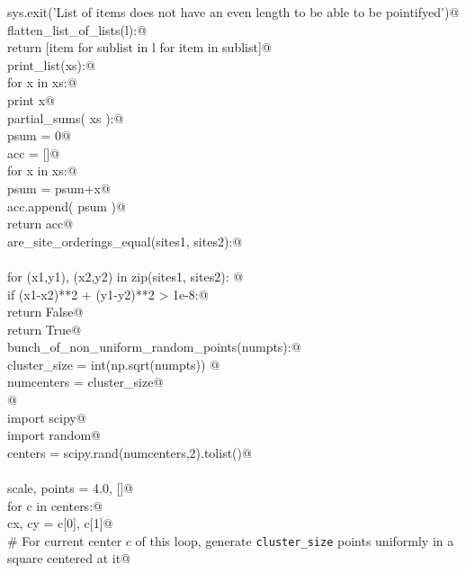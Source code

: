 \documentclass[10pt, english, oneside]{report}
\begin{document}
\begin{appendices}
\begin{flushleft}
\begin{list}{}{}
\mbox{}\verb@        sys.exit('List of items does not have an even length to be able to be pointifyed')@\\
\mbox{}\verb@def flatten_list_of_lists(l):@\\
\mbox{}\verb@       return [item for sublist in l for item in sublist]@\\
\mbox{}\verb@def print_list(xs):@\\
\mbox{}\verb@    for x in xs:@\\
\mbox{}\verb@        print x@\\
\mbox{}\verb@def partial_sums( xs ):@\\
\mbox{}\verb@    psum = 0@\\
\mbox{}\verb@    acc = []@\\
\mbox{}\verb@    for x in xs:@\\
\mbox{}\verb@        psum = psum+x@\\
\mbox{}\verb@        acc.append( psum )@\\
\mbox{}\verb@    return acc@\\
\mbox{}\verb@def are_site_orderings_equal(sites1, sites2):@\\
\mbox{}\verb@@\\
\mbox{}\verb@    for (x1,y1), (x2,y2) in zip(sites1, sites2): @\\
\mbox{}\verb@        if (x1-x2)**2 + (y1-y2)**2 > 1e-8:@\\
\mbox{}\verb@            return False@\\
\mbox{}\verb@    return True@\\
\mbox{}\verb@def bunch_of_non_uniform_random_points(numpts):@\\
\mbox{}\verb@    cluster_size = int(np.sqrt(numpts)) @\\
\mbox{}\verb@    numcenters   = cluster_size@\\
\mbox{}\verb@    @\\
\mbox{}\verb@    import scipy@\\
\mbox{}\verb@    import random@\\
\mbox{}\verb@    centers = scipy.rand(numcenters,2).tolist()@\\
\mbox{}\verb@@\\
\mbox{}\verb@    scale, points = 4.0, []@\\
\mbox{}\verb@    for c in centers:@\\
\mbox{}\verb@        cx, cy = c[0], c[1]@\\
\mbox{}\verb@        # For current center $c$ of this loop, generate \verb|cluster_size| points uniformly in a square centered at it@\\

\end{list}
\end{flushleft}
\end{appendices}
\end{document}
